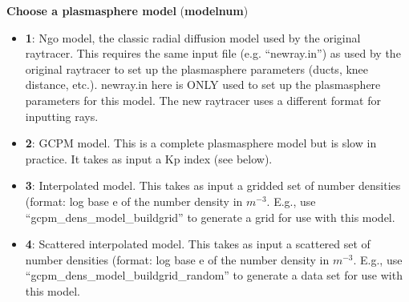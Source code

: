 \documentclass[10pt]{article}
\begin{document}
{\bf Choose a plasmasphere model} ({\bf modelnum})
\begin{itemize}
\item {\bf 1}: Ngo model, the classic radial diffusion model used
  by the original raytracer.  This requires the same input file
  (e.g. ``newray.in'') as used by the original raytracer to set
  up the plasmasphere parameters (ducts, knee distance, etc.).
  newray.in here is ONLY used to set up the plasmasphere
  parameters for this model.  The new raytracer uses a different
  format for inputting rays.
\item {\bf 2}: GCPM model.  This is a complete plasmasphere model
  but is slow in practice.  It takes as input a Kp index (see below).
\item {\bf 3}: Interpolated model.  This takes as input a gridded set
  of number densities (format: log base e of the number density in
  $m^{-3}$.  E.g., use \\``gcpm\_dens\_model\_buildgrid'' to generate
  a grid for use with this model.
\item {\bf 4}: Scattered interpolated model.  This takes as input a
  scattered set of number densities (format: log base e of the number
  density in $m^{-3}$.  E.g., use
  \\``gcpm\_dens\_model\_buildgrid\_random'' to generate a data set for
  use with this model.
\end{itemize}
\end{document}
